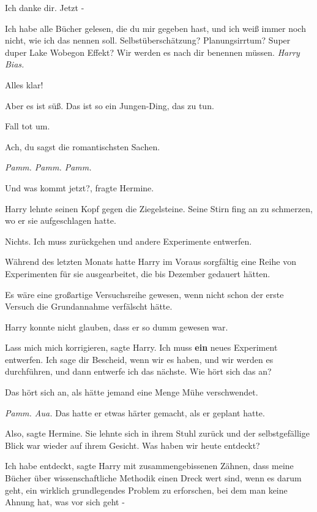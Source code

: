 \glqq{}Ich danke dir. Jetzt -\grqq{}

\glqq{}Ich habe alle Bücher gelesen, die du mir gegeben hast, und ich weiß immer
noch nicht, wie ich das nennen soll. Selbstüberschätzung? Planungsirrtum? Super
duper Lake Wobegon Effekt? Wir werden es nach dir benennen müssen. \emph{Harry
Bias.}\grqq{}

\glqq{}Alles klar!\grqq{}

\glqq{}Aber es ist süß. Das ist so ein Jungen-Ding, das zu tun.\grqq{}

\glqq{}Fall tot um.\grqq{}

\glqq{}Ach, du sagst die romantischsten Sachen.\grqq{}

\emph{Pamm. Pamm. Pamm.}

\glqq{}Und was kommt jetzt?\grqq{}, fragte Hermine.

Harry lehnte seinen Kopf gegen die Ziegelsteine. Seine Stirn fing an zu
schmerzen, wo er sie aufgeschlagen hatte.

\glqq{}Nichts. Ich muss zurückgehen und andere Experimente entwerfen.\grqq{}

Während des letzten Monats hatte Harry im Voraus sorgfältig eine Reihe von
Experimenten für sie ausgearbeitet, die bis Dezember gedauert hätten.

Es wäre eine großartige Versuchsreihe gewesen, wenn nicht schon der erste
Versuch die Grundannahme verfälscht hätte.

Harry konnte nicht glauben, dass er so dumm gewesen war.

\glqq{}Lass mich mich korrigieren\grqq{}, sagte Harry. \glqq{}Ich muss
\textbf{ein} neues Experiment entwerfen. Ich sage dir Bescheid, wenn wir es
haben, und wir werden es durchführen, und dann entwerfe ich das nächste. Wie
hört sich das an?\grqq{}

\glqq{}Das hört sich an, als hätte jemand eine Menge Mühe verschwendet.\grqq{}

\emph{Pamm. Aua.} Das hatte er etwas härter gemacht, als er geplant hatte.

\glqq{}Also\grqq{}, sagte Hermine. Sie lehnte sich in ihrem Stuhl zurück und der
selbstgefällige Blick war wieder auf ihrem Gesicht. \glqq{}Was haben wir heute
entdeckt?\grqq{}

\glqq{}Ich habe entdeckt\grqq{}, sagte Harry mit zusammengebissenen Zähnen, \glqq
dass meine Bücher über wissenschaftliche Methodik einen Dreck wert sind, wenn es
darum geht, ein wirklich grundlegendes Problem zu erforschen, bei dem man keine
Ahnung hat, was vor sich geht -\grqq{}

